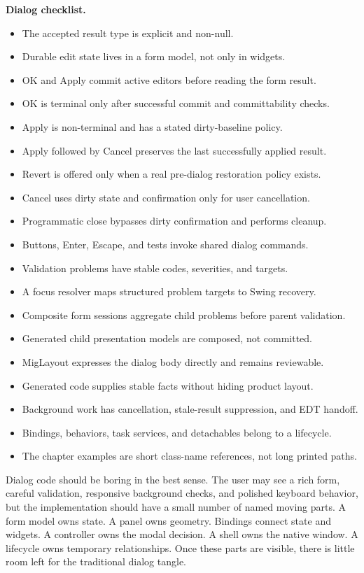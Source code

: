 \begin{center}
\textbf{Dialog checklist.}
\end{center}

\begin{itemize}
\item The accepted result type is explicit and non-null.
\item Durable edit state lives in a form model, not only in widgets.
\item OK and Apply commit active editors before reading the form result.
\item OK is terminal only after successful commit and committability checks.
\item Apply is non-terminal and has a stated dirty-baseline policy.
\item Apply followed by Cancel preserves the last successfully applied result.
\item Revert is offered only when a real pre-dialog restoration policy exists.
\item Cancel uses dirty state and confirmation only for user cancellation.
\item Programmatic close bypasses dirty confirmation and performs cleanup.
\item Buttons, Enter, Escape, and tests invoke shared dialog commands.
\item Validation problems have stable codes, severities, and targets.
\item A focus resolver maps structured problem targets to Swing recovery.
\item Composite form sessions aggregate child problems before parent validation.
\item Generated child presentation models are composed, not committed.
\item MigLayout expresses the dialog body directly and remains reviewable.
\item Generated code supplies stable facts without hiding product layout.
\item Background work has cancellation, stale-result suppression, and EDT handoff.
\item Bindings, behaviors, task services, and detachables belong to a lifecycle.
\item The chapter examples are short class-name references, not long printed paths.
\end{itemize}

Dialog code should be boring in the best sense. The user may see a rich form,
careful validation, responsive background checks, and polished keyboard
behavior, but the implementation should have a small number of named moving
parts. A form model owns state. A panel owns geometry. Bindings connect state
and widgets. A controller owns the modal decision. A shell owns the native
window. A lifecycle owns temporary relationships. Once these parts are visible,
there is little room left for the traditional dialog tangle.
